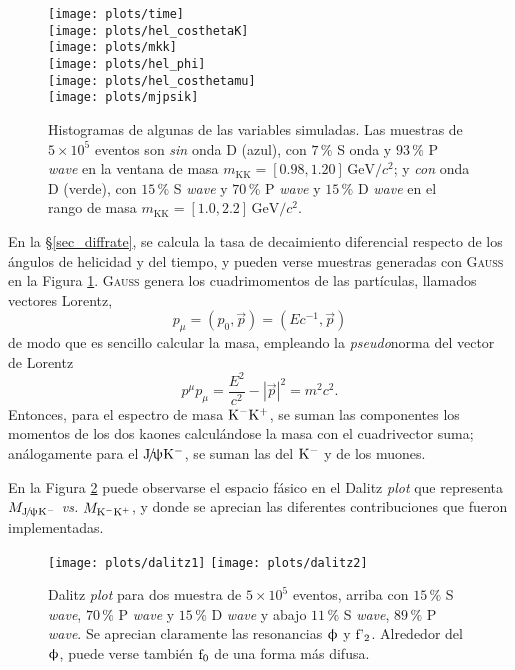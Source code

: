 \begin{figure}[H]
\begin{flushright}
\begin{multicols}{2}
\texttt{[image: plots/time]} \\
\texttt{[image: plots/hel\_costhetaK]} \\
\texttt{[image: plots/mkk]} \\
\texttt{[image: plots/hel\_phi]} \\
\texttt{[image: plots/hel\_costhetamu]} \\
\texttt{[image: plots/mjpsik]}
\end{multicols}
\end{flushright}
\caption{Histogramas de algunas de las variables simuladas. Las muestras de $5\times10^5$ eventos  son \emph{sin} onda D (azul), con $7\,\%$ S onda y $93\,\%$ P \emph{wave} en la ventana de masa $m_{\text{KK}} = [0.98,1.20]\,\mathrm{GeV}/c^2$; y \emph{con} onda D (verde), con $15\,\%$ S \emph{wave} y $70\,\%$ P \emph{wave} y $15\,\%$ D \emph{wave} en el rango de masa $m_{\text{KK}} = [1.0,2.2]\,\mathrm{GeV}/c^2$.}   \label{fig_evtgensamples1}
\end{figure}


En la \S \ref{sec_diffrate}, se calcula la tasa de decaimiento diferencial respecto de los ángulos de helicidad y del tiempo, y pueden verse muestras generadas con \textsc{Gauss} en la Figura \ref{fig_evtgensamples1}. \textsc{Gauss} genera los cuadrimomentos de las partículas, llamados vectores Lorentz, 
\[p_{\mu} = (p_0, \vec{p}) = (Ec^{-1},\vec{p})\]
de modo que es sencillo calcular la masa, empleando la \emph{pseudo}norma del vector de Lorentz
\[p^{\mu}p_{\mu} = \frac{E^2}{c^2} - |\vec{p}|^2 = m^2c^2. \]
Entonces, para el espectro de masa $\text{K}{}^{-}\text{K}{}^{+}$, se suman las componentes los momentos de los dos kaones calculándose la masa con el cuadrivector suma; análogamente para el $\text{J}\!/\!\uppsi\text{K}{}^{-}$, se suman las del $\text{K}{}^{-}$ y de los muones.

En la Figura \ref{fig_evtgensamples2} puede observarse el espacio fásico en el Dalitz \textit{plot} que representa $M_{\text{J}\!/\!\uppsi\text{K}{}^{-}}$ \emph{vs.} $M_{\text{K}{}^{-} \text{K}{}^{+}}$, y donde se aprecian las diferentes contribuciones que fueron implementadas.





\begin{figure}[H]
\centering
\texttt{[image: plots/dalitz1]}
\texttt{[image: plots/dalitz2]}
\caption{Dalitz \textit{plot} para dos muestra de $5\times 10^5$ eventos, arriba con $15\,\%$ S \emph{wave}, $70\,\%$ P \emph{wave} y $15\,\%$ D \emph{wave} y abajo $11\,\%$ S \emph{wave}, $89\,\%$ P \emph{wave}. Se aprecian claramente las resonancias $\upphi$ y $\text{f'}_2$. Alrededor del $\upphi$, puede verse también $\text{f}_0$ de una forma más difusa.}   \label{fig_evtgensamples2}
\end{figure}




